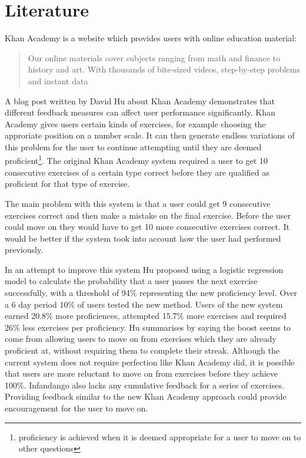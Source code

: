 \section{Literature}

Khan Academy\cite{khan_site} is a website which provides users with online education material:
\begin{quote}
Our online materials cover subjects ranging from math and finance to history and art.  With thousands of bite-sized videos, step-by-step problems and instant data\cite{ka_faq}
\end{quote}


A blog post\cite{khan_blog} written by David Hu about Khan Academy demonstrates that different feedback measures can affect user performance significantly. Khan Academy gives users certain kinds of exercises, for example choosing the approriate position on a number scale. It can then generate endless variations of this problem for the user to continue attempting until they are deemed proficient\footnote{
proficiency is achieved when it is deemed appropriate for a user to move on to other questions
}. The original Khan Academy system required a user to get 10 consecutive exercises of a certain type correct before they are qualified as proficient for that type of exercise. 

The main problem with this system is that a user could get 9 consecutive exercises correct and then make a mistake on the final exercise. Before the user could move on they would have to get 10 more consecutive exercises correct. It would be better if the system took into account how the user had performed previously. 

In an attempt to improve this system Hu proposed using a logistic regression model to calculate the probability that a user passes the next exercise successfully, with a threshold of 94\% representing the new proficiency level. Over a 6 day period 10\% of users tested the new method. Users of the new system earned 20.8\% more proficiences, attempted 15.7\% more exercises and required 26\% less exercises per proficiency. Hu summarises by saying the boost seems to come from allowing users to move on from exercises which they are already proficient at, without requiring them to complete their streak.
Although the current system does not require perfection like Khan Academy did, it is possible that users are more reluctant to move on from exercises before they achieve 100\%. Infandango also lacks any cumulative feedback for a series of exercises. Providing feedback similar to the new Khan Academy approach could provide encouragement for the user to move on.

